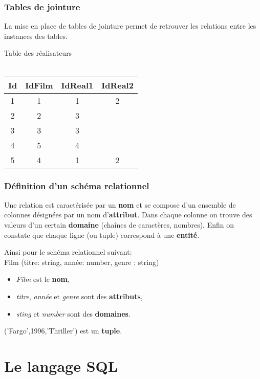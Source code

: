 \begin{frame}[fragile]
\frametitle{Tables de jointure}

La mise en place de tables de jointure permet de retrouver les relations entre les instances des tables.

\begin{center}
Table des réalisateurs \\ ~\ \\
\begin{tabular}{|c|c|c|c|}
\hline
\textbf{Id} & \textbf{IdFilm} & \textbf{IdReal1} & \textbf{IdReal2}\\
\hline
1 & 1 & 1 & 2\\
\hline
2 & 2 & 3 & \\
\hline
3 & 3 & 3 &  \\
\hline
4 & 5 & 4 & \\
\hline
5 & 4 & 1 & 2\\
\hline
\end{tabular}
\end{center}

\end{frame}

\begin{frame}[fragile]
\frametitle{Définition d'un schéma relationnel}

Une relation est caractérisée par un \textbf{nom} et se compose d'un ensemble de colonnes désignées par un nom d'\textbf{attribut}. Dans chaque colonne on trouve des valeurs d'un certain \textbf{domaine} (chaînes de caractères, nombres). Enfin on constate que chaque ligne (ou tuple) correspond à une \textbf{entité}.

Ainsi pour le schéma relationnel suivant:\\
Film (titre: string, année: number, genre : string)

\begin{itemize}
 \item \textit{Film} est le \textbf{nom},
 \item \textit{titre}, \textit{année} et \textit{genre} sont des \textbf{attributs},
 \item \textit{sting} et \textit{number} sont des \textbf{domaines}.
 \end{itemize}

('Fargo',1996,'Thriller') est un \textbf{tuple}.

\end{frame}

\section{Le langage SQL}

